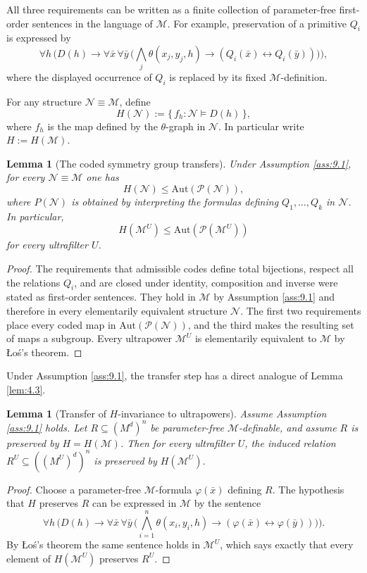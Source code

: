 \documentclass[11pt,a4paper]{article}
\renewcommand{\P}{\mathcal{P}}
\newcommand{\M}{\mathcal{M}}
\newtheorem{lemma}[theorem]{Lemma}
\theoremstyle{definition}
\begin{document}
All three requirements can be written as a finite collection of
parameter-free first-order sentences in the language of $\M$.
For example, preservation of a primitive $Q_i$ is expressed by \[
\forall h\,\big(D(h)\rightarrow
\forall \bar x\,\forall \bar y\,
\big(\bigwedge_j\theta(x_j,y_j,h)\rightarrow
(Q_i(\bar x)\leftrightarrow Q_i(\bar y))\big)\Big),
\] where the displayed occurrence of $Q_i$ is replaced by its fixed
$\M$-definition.

For any structure $\mathcal N\equiv\M$, define \[
H(\mathcal N):=
\{\,f_h:\mathcal N\models D(h)\,\},
\] where $f_h$ is the map defined by the $\theta$-graph in
$\mathcal N$. In particular write $H:=H(\M)$.

\begin{lemma}[The coded symmetry group transfers]
	\label{lem:9.2}
Under
Assumption \ref{ass:9.1}, for every $\mathcal N\equiv\M$ one has \[
H(\mathcal N)\le \mathrm{Aut}(\P(\mathcal N)),
\] where $P(\mathcal N)$ is obtained by interpreting the formulas
defining $Q_1,\dots,Q_k$ in $\mathcal N$. In particular, \[
H(\M^U)\le \mathrm{Aut}(\P(\M^U))
\] for every ultrafilter $U$.
\end{lemma}

\begin{proof}
The requirements that admissible codes define total
bijections, respect all the relations $Q_i$, and are closed under
identity, composition and inverse were stated as first-order sentences.
They hold in $\M$ by Assumption \ref{ass:9.1} and therefore in every
elementarily equivalent structure $\mathcal N$. The first two
requirements place every coded map in $\mathrm{Aut}(\P(\mathcal N))$,
and the third makes the resulting set of maps a subgroup. Every
ultrapower $\M^U$ is elementarily equivalent to $\M$
by Łoś's theorem.
\end{proof}


Under Assumption \ref{ass:9.1}, the transfer step has a direct analogue of Lemma
\ref{lem:4.3}.


\begin{lemma}[Transfer of $H$-invariance to ultrapowers]
	\label{lem:9.3}
Assume
Assumption \ref{ass:9.1} holds. Let $R\subseteq (M^d)^n$ be parameter-free
$\M$-definable, and assume $R$ is preserved by
$H=H(\M)$. Then for every ultrafilter $U$, the induced
relation $R^U\subseteq ((M^U)^d)^n$ is preserved by
$H(\M^U)$.
\end{lemma}

\begin{proof}
Choose a parameter-free $\M$-formula
$\varphi(\bar x)$ defining $R$. The hypothesis that $H$ preserves
$R$ can be expressed in $\M$ by the sentence \[
\forall h\,\big(D(h)\rightarrow
\forall \bar x\,\forall \bar y\,
\big(\bigwedge_{i=1}^n \theta(x_i,y_i,h)\rightarrow
(\varphi(\bar x)\leftrightarrow \varphi(\bar y))\Big)\Big).
\] By Łoś's theorem the same sentence holds in $\M^U$, which
says exactly that every element of $H(\M^U)$ preserves
$R^U$.
\end{proof}
\end{document}
